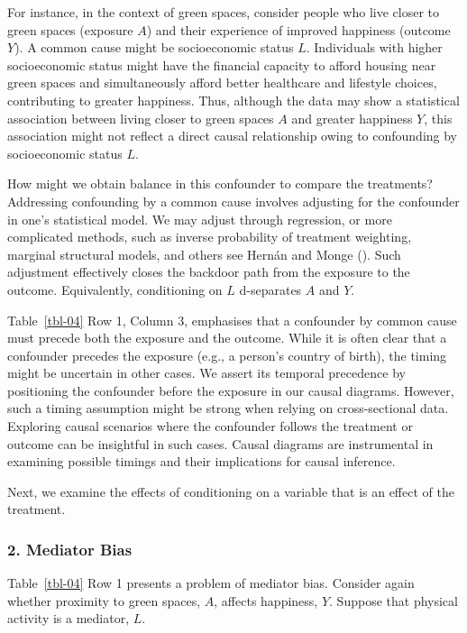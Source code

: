 \documentclass[
  singlecolumn]{article}
\begin{document}
For instance, in the context of green spaces, consider people who live
closer to green spaces (exposure \(A\)) and their experience of improved
happiness (outcome \(Y\)). A common cause might be socioeconomic status
\(L\). Individuals with higher socioeconomic status might have the
financial capacity to afford housing near green spaces and
simultaneously afford better healthcare and lifestyle choices,
contributing to greater happiness. Thus, although the data may show a
statistical association between living closer to green spaces \(A\) and
greater happiness \(Y\), this association might not reflect a direct
causal relationship owing to confounding by socioeconomic status \(L\).

How might we obtain balance in this confounder to compare the
treatments? Addressing confounding by a common cause involves adjusting
for the confounder in one's statistical model. We may adjust through
regression, or more complicated methods, such as inverse probability of
treatment weighting, marginal structural models, and others see Hernán
and Monge (). Such adjustment
effectively closes the backdoor path from the exposure to the outcome.
Equivalently, conditioning on \(L\) d-separates \(A\) and \(Y\).

Table~\ref{tbl-04} Row 1, Column 3, emphasises that a confounder by
common cause must precede both the exposure and the outcome. While it is
often clear that a confounder precedes the exposure (e.g., a person's
country of birth), the timing might be uncertain in other cases. We
assert its temporal precedence by positioning the confounder before the
exposure in our causal diagrams. However, such a timing assumption might
be strong when relying on cross-sectional data. Exploring causal
scenarios where the confounder follows the treatment or outcome can be
insightful in such cases. Causal diagrams are instrumental in examining
possible timings and their implications for causal inference.

Next, we examine the effects of conditioning on a variable that is an
effect of the treatment.

\subsubsection{2. Mediator Bias}\label{mediator-bias}

Table~\ref{tbl-04} Row 1 presents a problem of mediator bias. Consider
again whether proximity to green spaces, \(A\), affects happiness,
\(Y\). Suppose that physical activity is a mediator, \(L\).
\end{document}
